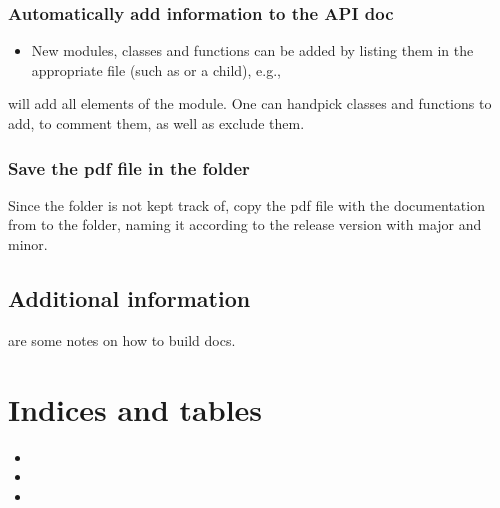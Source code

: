 \documentclass[letterpaper,10pt,english]{sphinxmanual}
\begin{document}
\subsection{Automatically add information to the API doc}
\label{\detokenize{toc-README-docs:automatically-add-information-to-the-api-doc}}\begin{itemize}
\item {} 
New modules, classes and functions can be added by listing them
in the appropriate  file (such as  or a child), e.g.,

\end{itemize}

\begin{sphinxVerbatim}[commandchars=\\\{\}]
  
\end{sphinxVerbatim}

will add all elements of the  module. One can hand\sphinxhyphen{}pick
classes and functions to add, to comment them, as well as exclude them.


\subsection{Save the pdf file in the  folder}
\label{\detokenize{toc-README-docs:save-the-pdf-file-in-the-docs-pdf-folder}}
Since the  folder is not kept track of, copy the pdf file
with the documentation from  to the  folder,
naming it according to the release version with major and minor.


\section{Additional information}
\label{\detokenize{toc-README-docs:additional-information}}
are some notes on how to build docs.


\chapter{Indices and tables}
\label{\detokenize{index:indices-and-tables}}\begin{itemize}
\item {} 

\item {} 

\item {} 

\end{itemize}
\end{document}
